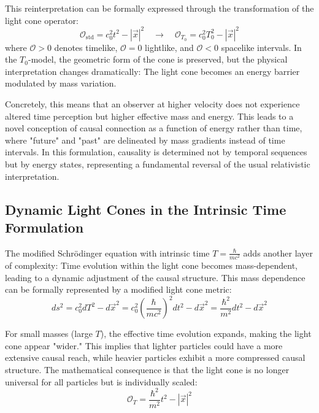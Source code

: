 \documentclass[a4paper,12pt]{article}
\begin{document}
	This reinterpretation can be formally expressed through the transformation of the light cone operator:
	\begin{equation}
		\mathcal{O}_{\text{std}} = c_0^2 t^2 - |\vec{x}|^2 \quad \rightarrow \quad \mathcal{O}_{T_0} = c_0^2 T_0^2 - |\vec{x}|^2
	\end{equation}
	where \( \mathcal{O} > 0 \) denotes timelike, \( \mathcal{O} = 0 \) lightlike, and \( \mathcal{O} < 0 \) spacelike intervals. In the \( T_0 \)-model, the geometric form of the cone is preserved, but the physical interpretation changes dramatically: The light cone becomes an energy barrier modulated by mass variation.
	
	Concretely, this means that an observer at higher velocity does not experience altered time perception but higher effective mass and energy. This leads to a novel conception of causal connection as a function of energy rather than time, where "future" and "past" are delineated by mass gradients instead of time intervals. In this formulation, causality is determined not by temporal sequences but by energy states, representing a fundamental reversal of the usual relativistic interpretation.
	
	\subsection{Dynamic Light Cones in the Intrinsic Time Formulation}
	The modified Schrödinger equation with intrinsic time \( T = \frac{\hbar}{m c^2} \) adds another layer of complexity: Time evolution within the light cone becomes mass-dependent, leading to a dynamic adjustment of the causal structure. This mass dependence can be formally represented by a modified light cone metric:
	\begin{equation}
		ds^2 = c_0^2 dT^2 - d\vec{x}^2 = c_0^2 \left(\frac{\hbar}{m c^2}\right)^2 dt^2 - d\vec{x}^2 = \frac{\hbar^2}{m^2} dt^2 - d\vec{x}^2
	\end{equation}
	
	For small masses (large \( T \)), the effective time evolution expands, making the light cone appear "wider." This implies that lighter particles could have a more extensive causal reach, while heavier particles exhibit a more compressed causal structure. The mathematical consequence is that the light cone is no longer universal for all particles but is individually scaled:
	\begin{equation}
		\mathcal{O}_T = \frac{\hbar^2}{m^2} t^2 - |\vec{x}|^2
	\end{equation}
	
\end{document}
